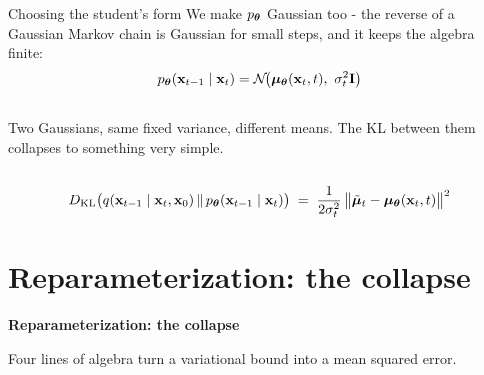 \documentclass[aspectratio=169]{beamer}
\begin{document}
\begin{frame}{Choosing the student's form}
  \small
  We make $p_{\bm{\theta}}$ Gaussian too - the reverse of a Gaussian Markov chain is Gaussian
  for small steps, and it keeps the algebra finite:
  \[
    p_{\thetav}(\xv_{t-1}\mid \xv_t) = \mathcal{N}\!\big(\bm\mu_{\thetav}(\xv_t,t),\ \sigma_t^2\id\big)
  \]
  \begin{columns}[T]
    \footnotesize
    Two Gaussians, same fixed variance, different means. The KL between them collapses to
    something very simple.
  \end{columns}
  \vskip 6pt
  \[
    D_{\mathrm{KL}}\big(q(\mathbf{x}_{t-1}\mid \mathbf{x}_t,\mathbf{x}_0)\,\|\,p_{\bm{\theta}}(\mathbf{x}_{t-1}\mid \mathbf{x}_t)\big)
    \;=\;
    \frac{1}{2\sigma_t^2}\,\big\|\tilde{\bm\mu}_t - \bm\mu_{\bm{\theta}}(\mathbf{x}_t,t)\big\|^2
  \]
  \vskip 2pt
\end{frame}

\section{Reparameterization: the collapse}

\begin{frame}[plain]
  \vfill
  \begin{center}
    {\Large\color{popblue}\textbf{Reparameterization: the collapse}}\\[0.9em]
    \begin{minipage}{0.82\textwidth}\centering\small
      Four lines of algebra turn a variational bound into a mean squared error.
    \end{minipage}
  \end{center}
  \vfill
\end{frame}
\end{document}
